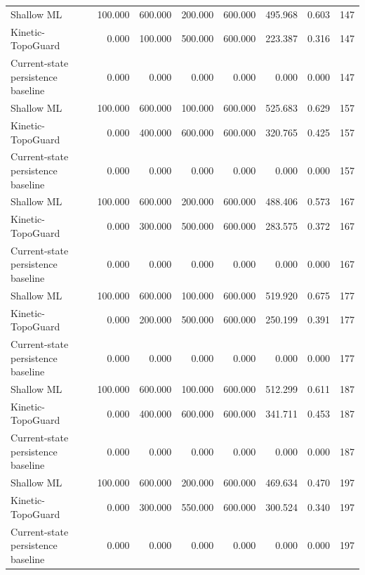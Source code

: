 \begin{tabular}{lrrrrrrr}
Shallow ML & 100.000 & 600.000 & 200.000 & 600.000 & 495.968 & 0.603 & 147 \\
Kinetic-TopoGuard & 0.000 & 100.000 & 500.000 & 600.000 & 223.387 & 0.316 & 147 \\
Current-state persistence baseline & 0.000 & 0.000 & 0.000 & 0.000 & 0.000 & 0.000 & 147 \\
Shallow ML & 100.000 & 600.000 & 100.000 & 600.000 & 525.683 & 0.629 & 157 \\
Kinetic-TopoGuard & 0.000 & 400.000 & 600.000 & 600.000 & 320.765 & 0.425 & 157 \\
Current-state persistence baseline & 0.000 & 0.000 & 0.000 & 0.000 & 0.000 & 0.000 & 157 \\
Shallow ML & 100.000 & 600.000 & 200.000 & 600.000 & 488.406 & 0.573 & 167 \\
Kinetic-TopoGuard & 0.000 & 300.000 & 500.000 & 600.000 & 283.575 & 0.372 & 167 \\
Current-state persistence baseline & 0.000 & 0.000 & 0.000 & 0.000 & 0.000 & 0.000 & 167 \\
Shallow ML & 100.000 & 600.000 & 100.000 & 600.000 & 519.920 & 0.675 & 177 \\
Kinetic-TopoGuard & 0.000 & 200.000 & 500.000 & 600.000 & 250.199 & 0.391 & 177 \\
Current-state persistence baseline & 0.000 & 0.000 & 0.000 & 0.000 & 0.000 & 0.000 & 177 \\
Shallow ML & 100.000 & 600.000 & 100.000 & 600.000 & 512.299 & 0.611 & 187 \\
Kinetic-TopoGuard & 0.000 & 400.000 & 600.000 & 600.000 & 341.711 & 0.453 & 187 \\
Current-state persistence baseline & 0.000 & 0.000 & 0.000 & 0.000 & 0.000 & 0.000 & 187 \\
Shallow ML & 100.000 & 600.000 & 200.000 & 600.000 & 469.634 & 0.470 & 197 \\
Kinetic-TopoGuard & 0.000 & 300.000 & 550.000 & 600.000 & 300.524 & 0.340 & 197 \\
Current-state persistence baseline & 0.000 & 0.000 & 0.000 & 0.000 & 0.000 & 0.000 & 197 \\
\bottomrule
\end{tabular}